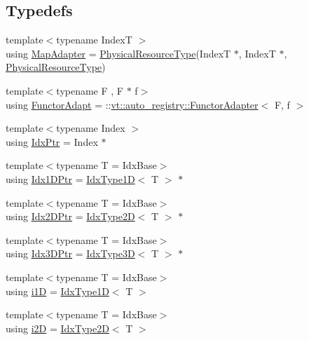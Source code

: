 \subsection*{Typedefs}
\begin{DoxyCompactItemize}
\item 
{\footnotesize template$<$typename IndexT $>$ }\\using \hyperlink{namespacevt_1_1mapping_a41b113c28bb6430fbcb5be66e08ccf9f}{Map\+Adapter} = \hyperlink{namespacevt_a2dc36fcada816dc6d11774d650328ee9}{Physical\+Resource\+Type}(IndexT $\ast$, IndexT $\ast$, \hyperlink{namespacevt_a2dc36fcada816dc6d11774d650328ee9}{Physical\+Resource\+Type})
\item 
{\footnotesize template$<$typename F , F $\ast$ f$>$ }\\using \hyperlink{namespacevt_1_1mapping_a9502cb3a918b8389f64351638edab39f}{Functor\+Adapt} = \+::\hyperlink{structvt_1_1auto__registry_1_1_functor_adapter}{vt\+::auto\+\_\+registry\+::\+Functor\+Adapter}$<$ F, f $>$
\item 
{\footnotesize template$<$typename Index $>$ }\\using \hyperlink{namespacevt_1_1mapping_a1bcab0d331bff853fe09c964d5e9cc8c}{Idx\+Ptr} = Index $\ast$
\item 
{\footnotesize template$<$typename T  = Idx\+Base$>$ }\\using \hyperlink{namespacevt_1_1mapping_a8b576cf2f31069778e4951f64bccafd8}{Idx1\+D\+Ptr} = \hyperlink{namespacevt_a36127c6500f2311908c959be653da40e}{Idx\+Type1D}$<$ T $>$ $\ast$
\item 
{\footnotesize template$<$typename T  = Idx\+Base$>$ }\\using \hyperlink{namespacevt_1_1mapping_a6832cbb1361fe72fd7ec730e7b7773b3}{Idx2\+D\+Ptr} = \hyperlink{namespacevt_ab0fbc5ddf69b5aa0ed6a8d1658b504eb}{Idx\+Type2D}$<$ T $>$ $\ast$
\item 
{\footnotesize template$<$typename T  = Idx\+Base$>$ }\\using \hyperlink{namespacevt_1_1mapping_aacc737158b6517f2d760ffc8d1b5abca}{Idx3\+D\+Ptr} = \hyperlink{namespacevt_a65e4a83c0567ecb7a54b78e9b8e7d7ab}{Idx\+Type3D}$<$ T $>$ $\ast$
\item 
{\footnotesize template$<$typename T  = Idx\+Base$>$ }\\using \hyperlink{namespacevt_1_1mapping_af0c14a9a77e0311b3d089143ed93ba76}{i1D} = \hyperlink{namespacevt_a36127c6500f2311908c959be653da40e}{Idx\+Type1D}$<$ T $>$
\item 
{\footnotesize template$<$typename T  = Idx\+Base$>$ }\\using \hyperlink{namespacevt_1_1mapping_a6448c875e0807b43f31e96fc5b0cec04}{i2D} = \hyperlink{namespacevt_ab0fbc5ddf69b5aa0ed6a8d1658b504eb}{Idx\+Type2D}$<$ T $>$

\end{DoxyCompactItemize}
